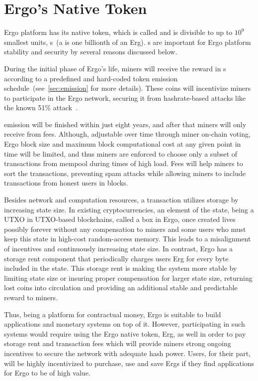 \section{Ergo's Native Token}
\label{sec:currency}

Ergo platform has its native token, which is
called \Erg{} and is divisible to up to $10^9$ smallest units, \nanoErg{}s~(a \nanoErg is one billionth of an Erg).
\Erg{}s are important for Ergo platform stability and security by several reasons discussed below.

During the initial phase of Ergo's life, miners will receive the reward in \Erg{}s
according to a predefined and hard-coded token emission schedule~(see~\ref{sec:emission} for more details).
These coins will incentivize miners to participate in the Ergo network, securing it from hashrate-based attacks
like the known 51\% attack~\cite{reorgAttack}.

\Erg{} emission will be finished within just eight years, and after that miners will only receive \Erg{} from
fees.
Although, adjustable over time through miner on-chain voting, Ergo block size and maximum block computational
cost at any given point in time will be limited,
and thus miners are enforced to
choose only a subset of transactions from mempool during times of high load.
Fees will help miners to sort the transactions, preventing spam attacks while allowing miners
to include transactions from honest users in blocks.

Besides network and computation resources, a transaction utilizes storage by increasing state size.
In existing cryptocurrencies, an element of the state, being  a UTXO  in  UTXO-based  blockchains,  called  a box
in  Ergo, once created lives possibly forever without any compensation to miners and some users who must keep this state
in high-cost random-access memory. This leads to a misalignment of incentives and continuously increasing state size.
In contrast, Ergo has a storage rent component that periodically charges users Erg for every byte
included in the state.
This storage rent is making the system more stable by limiting state size or insuring proper compensation for larger
state size, returning lost coins into
circulation and providing an additional stable and predictable reward to miners.

Thus, being a platform for contractual money, Ergo is suitable to build applications and monetary systems
on top of it.
However, participating in such systems would require using the Ergo native token, Erg, as well in order to pay
storage rent and transaction fees which will provide miners strong ongoing incentives to secure the network with
adequate hash power. Users, for their part, will be highly incentivized to purchase, use and save Ergs if they
find applications for Ergo to be of high value.

